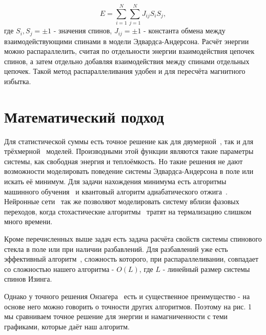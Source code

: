 \documentclass[utf8, babel, sor, jor, amsmath, amssymb, reprint]{elsarticle} %
\begin{document}
	\begin{equation}
		E = \sum\limits_{i=1}^N \sum\limits_{j=1}^N J_{ij} S_i S_j,
	\end{equation}
	где $S_i, S_j = \pm 1$ - значения спинов, $J_{ij} = \pm 1$ - константа обмена между взаимодействующими спинами в модели Эдвардса-Андерсона. Расчёт энергии можно распараллелить, считая по отдельности энергии взаимодействия цепочек спинов, а затем отдельно добавляя взаимодействия между спинами отдельных цепочек. Такой метод распараллеливания удобен и для пересчёта магнитного избытка. 

	\section{Математический подход}

	Для статистической суммы есть точное решение как для двумерной~\cite{onsager1944crystal}, так и для трёхмерной~\cite{zhang2023exact} моделей. Производными этой функции являются такие параметры системы, как свободная энергия и теплоёмкость. Но такие решения не дают возможности моделировать поведение системы Эдвардса-Андерсона в поле или искать её минимум. Для задачи нахождения минимума есть алгоритмы машинного обучения~\cite{maren1991logical} и квантовый алгоритм адиабатического отжига~\cite{grant2020adiabatic}. Нейронные сети~\cite{Korol2021} так же позволяют моделировать систему вблизи фазовых переходов, когда стохастические алгоритмы~\cite{janke2008monte} тратят на термализацию слишком много времени.

	Кроме перечисленных выше задач есть задача расчёта свойств системы спинового стекла в поле или при наличии разбавлений. Для разбавлений уже есть эффективный алгоритм~\cite{loh2006efficient}, сложность которого, при распараллеливании, совпадает со сложностью нашего алгоритма - $O(L)$, где $L$ - линейный размер системы спинов Изинга.

	Однако у точного решения Онзагера~\cite{onsager1944crystal} есть и существенное преимущество - на основе него можно говорить о точности других алгоритмов. Поэтому на рис. 1 мы сравниваем точное решение для энергии и намагниченности с теми графиками, которые даёт наш алгоритм.
\end{document}
